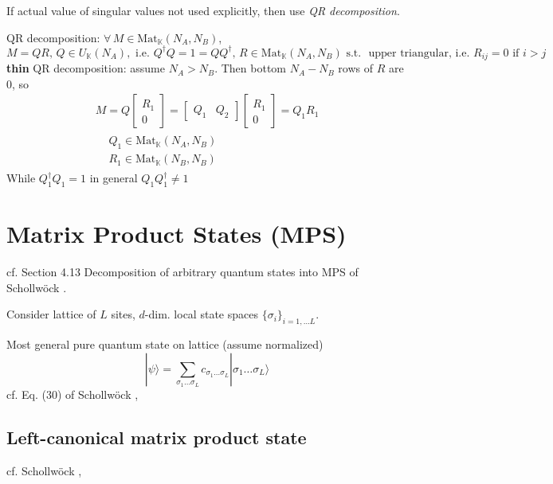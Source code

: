 If actual value of singular values not used explicitly, then use \emph{QR decomposition}.  

QR decomposition: $\forall \, M \in \text{Mat}_{\mathbb{K}}(N_A,N_B)$, 
\begin{equation}
M=QR, \, Q\in U_{\mathbb{K}}(N_A), \text{ i.e. } Q^{\dag}Q = 1=QQ^{\dag} , \, R \in \text{Mat}_{\mathbb{K}}(N_A,N_B) \text{ s.t. } \text{ upper triangular, i.e. } R_{ij}= 0 \text{ if } i >j 
\end{equation}
\textbf{thin} QR decomposition: assume $N_A>N_B$.  Then bottom $N_A-N_B$ rows of $R$ are $0$, so 
\[
\begin{gathered}
M=Q \left[ \begin{matrix} R_1 \\ 0 \end{matrix} \right] = \left[ \begin{matrix} Q_1 & Q_2 \end{matrix} \right] \left[ \begin{matrix} R_1 \\ 0 \end{matrix} \right] = Q_1R_1 \\
\begin{aligned}
& Q_1 \in \text{Mat}_{\mathbb{K}}(N_A,N_B) \\ 
& R_1 \in \text{Mat}_{\mathbb{K}}(N_B,N_B) 
\end{aligned}
\end{gathered}
\]
While $Q_1^{\dag}Q_1=1$ in general $Q_1 Q_1^{\dag} \neq 1$

\section{Matrix Product States (MPS)}

cf. Section 4.13 Decomposition of arbitrary quantum states into MPS of  Schollw\"{o}ck \cite{agat:Scho2010}.  

Consider lattice of $L$ sites, $d$-dim. local state spaces $\lbrace \sigma_i \rbrace_{i=1,\dots L}$.  

Most general pure quantum state on lattice (assume normalized) 
\begin{equation}
|\psi \rangle = \sum_{\sigma_1 \dots \sigma_L} c_{\sigma_1 \dots \sigma_L }|\sigma_1 \dots \sigma_L \rangle
\end{equation}
cf. Eq. (30) of  Schollw\"{o}ck \cite{agat:Scho2010},

\subsection{Left-canonical matrix product state}  
cf.  Schollw\"{o}ck \cite{agat:Scho2010},

